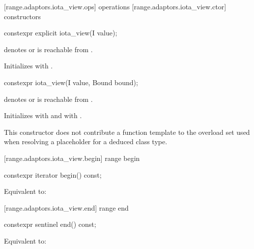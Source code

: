 \begin{addedblock}
[range.adaptors.iota_view.ops]{ operations}
[range.adaptors.iota_view.ctor]{ constructors}

%
\begin{itemdecl}
constexpr explicit iota_view(I value);
\end{itemdecl}

\begin{itemdescr}
\pnum
\expects
{} denotes  or
 is reachable from .

\pnum
\effects Initializes  with .
\end{itemdescr}

%
\begin{itemdecl}
constexpr iota_view(I value, Bound bound);
\end{itemdecl}

\begin{itemdescr}
\pnum
\expects
{} denotes  or
 is reachable from .

\pnum
\effects Initializes  with  and
 with .

\pnum
\remarks This constructor does not contribute a function template to the overload
set used when resolving a placeholder for a deduced class
type.
\end{itemdescr}

[range.adaptors.iota_view.begin]{ range begin}

%
\begin{itemdecl}
constexpr iterator begin() const;
\end{itemdecl}

\begin{itemdescr}
\pnum
\effects Equivalent to: 
\end{itemdescr}

[range.adaptors.iota_view.end]{ range end}

%
\begin{itemdecl}
constexpr sentinel end() const;
\end{itemdecl}

\begin{itemdescr}
\pnum
\effects Equivalent to: 
\end{itemdescr}


\end{addedblock}
